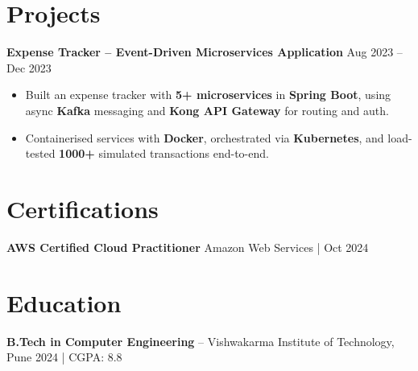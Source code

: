 \documentclass[a4paper,10pt]{article}
\begin{document}
\section*{Projects}

\textbf{Expense Tracker -- Event-Driven Microservices Application} \hfill Aug 2023 -- Dec 2023
\begin{itemize}[leftmargin=*]
    \item Built an expense tracker with \textbf{5+ microservices} in \textbf{Spring Boot}, using async \textbf{Kafka} messaging and \textbf{Kong API Gateway} for routing and auth.
    \item Containerised services with \textbf{Docker}, orchestrated via \textbf{Kubernetes}, and load-tested \textbf{1000+} simulated transactions end-to-end.
\end{itemize}

\section*{Certifications}
\textbf{AWS Certified Cloud Practitioner} \hfill Amazon Web Services \;|\; Oct 2024

\section*{Education}
\textbf{B.Tech in Computer Engineering} -- Vishwakarma Institute of Technology, Pune \hfill 2024 \;|\; CGPA: 8.8
\end{document}
